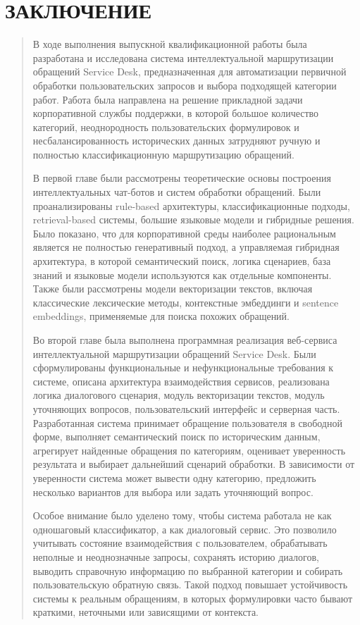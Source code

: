 \documentclass[
]{article}
\begin{document}
\hypertarget{ux437ux430ux43aux43bux44eux447ux435ux43dux438ux435}{%
\section{ЗАКЛЮЧЕНИЕ}\label{ux437ux430ux43aux43bux44eux447ux435ux43dux438ux435}}

\begin{quote}
В ходе выполнения выпускной квалификационной работы была разработана и
исследована система интеллектуальной маршрутизации обращений Service
Desk, предназначенная для автоматизации первичной обработки
пользовательских запросов и выбора подходящей категории работ. Работа
была направлена на решение прикладной задачи корпоративной службы
поддержки, в которой большое количество категорий, неоднородность
пользовательских формулировок и несбалансированность исторических данных
затрудняют ручную и полностью классификационную маршрутизацию обращений.

В первой главе были рассмотрены теоретические основы построения
интеллектуальных чат-ботов и систем обработки обращений. Были
проанализированы rule-based архитектуры, классификационные подходы,
retrieval-based системы, большие языковые модели и гибридные решения.
Было показано, что для корпоративной среды наиболее рациональным
является не полностью генеративный подход, а управляемая гибридная
архитектура, в которой семантический поиск, логика сценариев, база
знаний и языковые модели используются как отдельные компоненты. Также
были рассмотрены модели векторизации текстов, включая классические
лексические методы, контекстные эмбеддинги и sentence embeddings,
применяемые для поиска похожих обращений.

Во второй главе была выполнена программная реализация веб-сервиса
интеллектуальной маршрутизации обращений Service Desk. Были
сформулированы функциональные и нефункциональные требования к системе,
описана архитектура взаимодействия сервисов, реализована логика
диалогового сценария, модуль векторизации текстов, модуль уточняющих
вопросов, пользовательский интерфейс и серверная часть. Разработанная
система принимает обращение пользователя в свободной форме, выполняет
семантический поиск по историческим данным, агрегирует найденные
обращения по категориям, оценивает уверенность результата и выбирает
дальнейший сценарий обработки. В зависимости от уверенности система
может вывести одну категорию, предложить несколько вариантов для выбора
или задать уточняющий вопрос.

Особое внимание было уделено тому, чтобы система работала не как
одношаговый классификатор, а как диалоговый сервис. Это позволило
учитывать состояние взаимодействия с пользователем, обрабатывать
неполные и неоднозначные запросы, сохранять историю диалогов, выводить
справочную информацию по выбранной категории и собирать пользовательскую
обратную связь. Такой подход повышает устойчивость системы к реальным
обращениям, в которых формулировки часто бывают краткими, неточными или
зависящими от контекста.


\end{quote}
\end{document}
